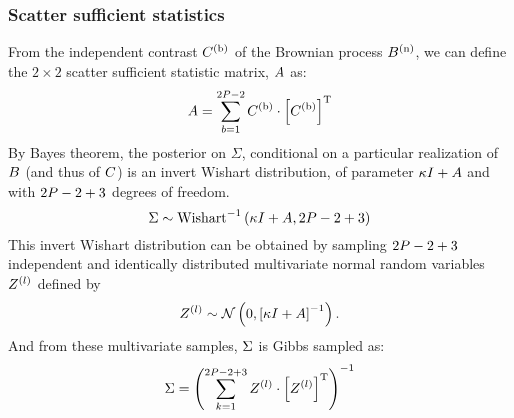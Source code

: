 \subsubsection{Scatter sufficient statistics}
From the independent contrast $C^{(\text{b})}$ of the Brownian process $B^{(\text{n})}$, we can define the $2 \times 2$ scatter sufficient statistic matrix, $A$ as:
\begin{equation}
    A = \sum_{b=1}^{2 P - 2} C^{(\text{b})} \cdot \left[C^{(\text{b})}\right]^{\mathrm{T}}
\end{equation}
By Bayes theorem, the \gls{posterior} on $\Sigma$, conditional on a particular realization of $B$ (and thus of $C$) is an invert Wishart distribution, of parameter $\kappa I + A$ and with $2 P - 2 + 3$ degrees of freedom.
\begin{equation}
    \Sigma \sim \mathrm{Wishart}^{-1}\left( \kappa I + A, 2 P - 2 + 3\right)
\end{equation}
This invert Wishart distribution can be obtained by sampling $2 P - 2 + 3$ independent and identically distributed multivariate normal random variables $Z^{(l)}$ defined by
\begin{equation}
    Z^{(l)} \sim \mathcal{N} \left( 0, \left[\kappa I + A\right]^{-1} \right).
\end{equation}
And from these multivariate samples, $\Sigma$ is Gibbs sampled as:
\begin{equation}
    \Sigma = \left( \sum_{k=1}^{2 P - 2 + 3} Z^{(l)} \cdot \left[Z^{(l)} \right] ^{\mathrm{T}} \right)^{-1}
\end{equation}
